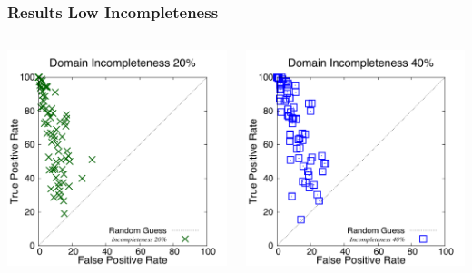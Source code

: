 \documentclass{beamer}
\begin{document}
\begin{frame}[c]\frametitle{Results Low Incompleteness}
	\begin{columns}
		\begin{column}{0.45\textwidth}
			\centering
		\includegraphics[width=.9\linewidth]{roc_space_incomplete/rocspace-domain_incompleteness-20.pdf}
		\end{column}
		\begin{column}{0.45\textwidth}
			\centering
		\includegraphics[width=.9\linewidth]{roc_space_incomplete/rocspace-domain_incompleteness-40.pdf}
		\end{column}
	\end{columns}
\end{frame}
\end{document}
